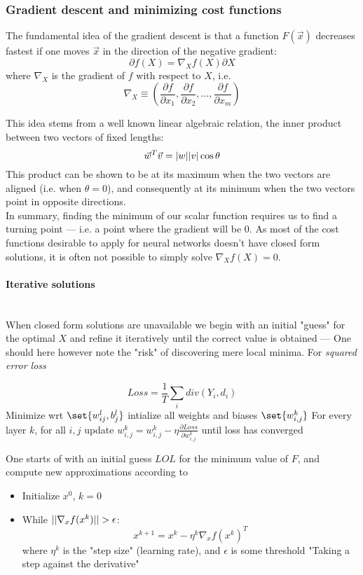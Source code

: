 \documentclass[10pt, a4paper, twocolumn]{article}
\newcommand{\myparagraph}[1]{\paragraph{#1}\mbox{}\\}
\DeclarePairedDelimiter\abs{\lvert}{\rvert}%
\DeclarePairedDelimiter\set\{\}
\begin{document}
		\subsubsection{Gradient descent and minimizing cost functions}
			The fundamental idea of the gradient descent is that a function $F(\vec{x})$ decreases fastest if one moves $\vec{x}$ in the direction of the negative gradient:
				$$\partial f(X)=\nabla_X f(X)\partial X$$
			where $\nabla_X$ is the gradient of $f$ with respect to $X$, i.e.
				$$\nabla_X\equiv \left(\frac{\partial f}{\partial x_1},\frac{\partial f}{\partial x_2},\dots,\frac{\partial f}{\partial x_m}\right)$$
			
			This idea stems from a well known linear algebraic relation, the inner product between two vectors of fixed lengths:
				$$\vec{w}^T\vec{v}=\abs{w}\abs{v}\cos{\theta}$$
			This product can be shown to be at its maximum when the two vectors are aligned (i.e. when $\theta = 0$), and consequently at its minimum when the two vectors point in opposite directions.\\
			In summary, finding the minimum of our scalar function requires us to find a turning point --- i.e. a point where the gradient will be $0$. As most of the cost functions desirable to apply for neural networks doesn't have  closed form solutions, it is often not possible to simply solve $\nabla_X f(X)=0$.
			\myparagraph{Iterative solutions}
				When closed form solutions are unavailable we begin with an initial "guess" for the optimal $X$ and refine it iteratively until the correct value is obtained
				--- One should here however note the "risk" of discovering mere local minima.
				For \emph{squared error loss}
				
					$$Loss=\frac{1}{T}\sum_i div(Y_i,d_i)$$
				Minimize wrt $\set{w_{ij}^l,b_j^l}$
				intialize all weights and biases $\set{w_{i,j}^k}$
				For every layer $k$, for all $i,j$ update $w_{i,j}^k=w_{i,j}^k-\eta\frac{\partial Loss}{\partial w_{i,j}^k}$ until loss has converged
				
			One starts of with an initial guess $LOL$ for the minimum value of $F$, and compute new approximations according to
			\begin{itemize}
				\item Initialize $x^0$, $k=0$
				\item While $\abs{\abs{\nabla_x f(x^k)}}>\epsilon$:
				$$x^{k+1}=x^k-\eta^k \nabla_x f(x^k)^T$$
				where $\eta^k$ is the "step size" (learning rate), and $\epsilon$ is some threshold  "Taking a step against the derivative"
			\end{itemize}
\end{document}
